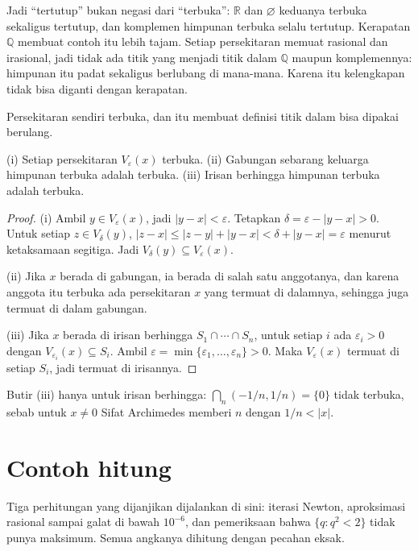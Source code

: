 Jadi ``tertutup'' bukan negasi dari ``terbuka'': $\mathbb{R}$ dan $\varnothing$
keduanya terbuka sekaligus tertutup, dan komplemen himpunan terbuka selalu tertutup.
Kerapatan $\mathbb{Q}$ membuat contoh itu lebih tajam. Setiap persekitaran memuat
rasional dan irasional, jadi tidak ada titik yang menjadi titik dalam $\mathbb{Q}$
maupun komplemennya: himpunan itu padat sekaligus berlubang di mana-mana. Karena itu
kelengkapan tidak bisa diganti dengan kerapatan.

Persekitaran sendiri terbuka, dan itu membuat definisi titik dalam bisa dipakai
berulang.

\begin{proposisi}
(i) Setiap persekitaran $V_\varepsilon(x)$ terbuka. (ii) Gabungan sebarang keluarga
himpunan terbuka adalah terbuka. (iii) Irisan berhingga himpunan terbuka adalah
terbuka.
\end{proposisi}

\begin{proof}
(i) Ambil $y\in V_\varepsilon(x)$, jadi $|y-x|<\varepsilon$. Tetapkan
$\delta=\varepsilon-|y-x|>0$. Untuk setiap $z\in V_\delta(y)$,
$|z-x|\le|z-y|+|y-x|<\delta+|y-x|=\varepsilon$ menurut ketaksamaan segitiga. Jadi
$V_\delta(y)\subseteq V_\varepsilon(x)$.

(ii) Jika $x$ berada di gabungan, ia berada di salah satu anggotanya, dan karena
anggota itu terbuka ada persekitaran $x$ yang termuat di dalamnya, sehingga juga
termuat di dalam gabungan.

(iii) Jika $x$ berada di irisan berhingga $S_1\cap\cdots\cap S_n$, untuk setiap $i$ ada
$\varepsilon_i>0$ dengan $V_{\varepsilon_i}(x)\subseteq S_i$. Ambil
$\varepsilon=\min\{\varepsilon_1,\ldots,\varepsilon_n\}>0$. Maka
$V_\varepsilon(x)$ termuat di setiap $S_i$, jadi termuat di irisannya.
\end{proof}

Butir (iii) hanya untuk irisan berhingga: $\bigcap_n(-1/n,1/n)=\{0\}$ tidak terbuka,
sebab untuk $x\neq0$ Sifat Archimedes memberi $n$ dengan $1/n<|x|$.

\section{Contoh hitung}

Tiga perhitungan yang dijanjikan dijalankan di sini: iterasi Newton, aproksimasi
rasional sampai galat di bawah $10^{-6}$, dan pemeriksaan bahwa $\{q:q^2<2\}$ tidak
punya maksimum. Semua angkanya dihitung dengan pecahan eksak.

